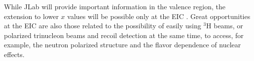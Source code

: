 While JLab will provide important information
in the valence region, the extension to lower
$x$ values will be possible only at the EIC \cite{Accardi:2012qut}. 
Great opportunities at the EIC are also those related to the possibility
of easily using $^3$H beams, or polarized trinucleon beams and 
recoil detection at the same time, to access, for example, 
the neutron polarized structure and the flavor dependence 
of nuclear effects.





